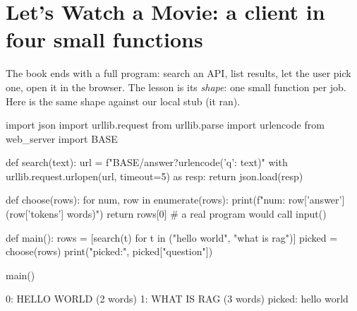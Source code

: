\section{Let's Watch a Movie: a client in four small functions}

The book ends with a full program: search an API, list results, let the user pick one, open it in
the browser. The lesson is its \emph{shape}: one small function per job. Here is the same shape
against our local stub (it ran).

\begin{center}
\end{center}

\begin{pycode}
import json
import urllib.request
from urllib.parse import urlencode
from web_server import BASE


def search(text):
    url = f"{BASE}/answer?{urlencode({'q': text})}"
    with urllib.request.urlopen(url, timeout=5) as resp:
        return json.load(resp)


def choose(rows):
    for num, row in enumerate(rows):
        print(f"{num}: {row['answer']} ({row['tokens']} words)")
    return rows[0]            # a real program would call input()


def main():
    rows = [search(t) for t in ("hello world", "what is rag")]
    picked = choose(rows)
    print("picked:", picked["question"])


main()
\end{pycode}
\begin{rawcode}
0: HELLO WORLD (2 words)
1: WHAT IS RAG (3 words)
picked: hello world
\end{rawcode}

